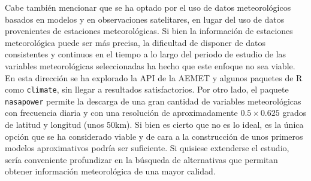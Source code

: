 \documentclass[12pt,a4paper,]{book}
\numberwithin{dummy}{section}
\theoremstyle{ocrenumbox}
\theoremstyle{blacknumex}
\theoremstyle{blacknumbox}
\theoremstyle{ocrenum}
\theoremstyle{ocrenum}
\begin{document}
Cabe también mencionar que se ha optado por el uso de datos
meteorológicos basados en modelos y en observaciones satelitares, en
lugar del uso de datos provenientes de estaciones meteorológicas. Si
bien la información de estaciones meteorológica puede ser más precisa,
la dificultad de disponer de datos consistentes y continuos en el tiempo
a lo largo del periodo de estudio de las variables meteorológicas
seleccionadas ha hecho que este enfoque no sea viable. En esta dirección
se ha explorado la API de la AEMET y algunos paquetes de R como
\texttt{climate}, sin llegar a resultados satisfactorios. Por otro lado,
el paquete \texttt{nasapower} permite la descarga de una gran cantidad
de variables meteorológicas con frecuencia diaria y con una resolución
de aproximadamente \(0.5 \times 0.625\) grados de latitud y longitud
(unos 50km). Si bien es cierto que no es lo ideal, es la única opción
que se ha considerado viable y de cara a la construcción de unos
primeros modelos aproximativos podría ser suficiente. Si quisiese
extenderse el estudio, sería conveniente profundizar en la búsqueda de
alternativas que permitan obtener información meteorológica de una mayor
calidad.
\end{document}
